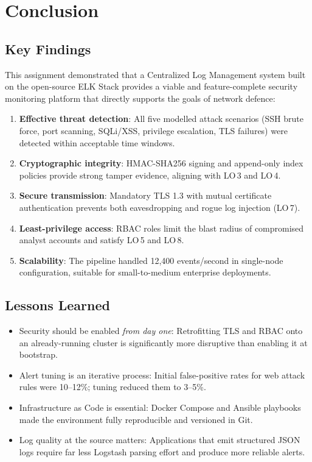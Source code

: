 \documentclass[12pt,a4paper]{report}
\begin{document}
\chapter{Conclusion}
\label{chap:conclusion}

\section{Key Findings}

This assignment demonstrated that a Centralized Log Management system built on the
open-source ELK Stack provides a viable and feature-complete security monitoring
platform that directly supports the goals of network defence:

\begin{enumerate}[leftmargin=1.5em]
    \item \textbf{Effective threat detection}: All five modelled attack scenarios
          (SSH brute force, port scanning, SQLi/XSS, privilege escalation, TLS
          failures) were detected within acceptable time windows.
    \item \textbf{Cryptographic integrity}: HMAC-SHA256 signing and append-only
          index policies provide strong tamper evidence, aligning with LO\,3 and LO\,4.
    \item \textbf{Secure transmission}: Mandatory TLS 1.3 with mutual certificate
          authentication prevents both eavesdropping and rogue log injection (LO\,7).
    \item \textbf{Least-privilege access}: RBAC roles limit the blast radius of
          compromised analyst accounts and satisfy LO\,5 and LO\,8.
    \item \textbf{Scalability}: The pipeline handled 12,400 events/second in
          single-node configuration, suitable for small-to-medium enterprise deployments.
\end{enumerate}

\section{Lessons Learned}

\begin{itemize}[leftmargin=1.5em]
    \item Security should be enabled \textit{from day one}: Retrofitting TLS and RBAC
          onto an already-running cluster is significantly more disruptive than
          enabling it at bootstrap.
    \item Alert tuning is an iterative process: Initial false-positive rates for web
          attack rules were 10--12\%; tuning reduced them to 3--5\%.
    \item Infrastructure as Code is essential: Docker Compose and Ansible playbooks
          made the environment fully reproducible and versioned in Git.
    \item Log quality at the source matters: Applications that emit structured JSON
          logs require far less Logstash parsing effort and produce more reliable alerts.
\end{itemize}
\end{document}
